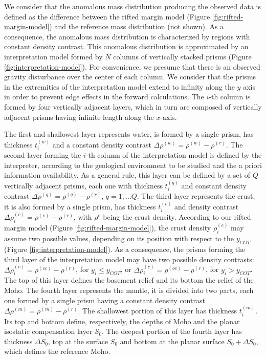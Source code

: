 \documentclass[manuscript]{geophysics}
\begin{document}
We consider that the anomalous mass distribution producing the observed data
is defined as the difference between the rifted margin model (Figure
\ref{fig:rifted-margin-model}) and the reference mass distribution (not shown).
As a consequence, the anomalous mass distribution is characterized by regions
with constant density contrast.
This anomalous distribution is approximated by an interpretation model 
formed by $N$ columns of vertically stacked prisms (Figure 
\ref{fig:interpretation-model}).
For convenience, we presume that there is an observed gravity disturbance over the
center of each column.
We consider that the prisms in the extremities of the interpretation model extend to
infinity along the $y$ axis in order to prevent edge effects in the forward 
calculations. 
The $i$-th column is formed by four vertically adjacent layers, which in turn are
composed of vertically adjacent prisms having infinite length along the $x$-axis.

The first and shallowest layer represents water, 
is formed by a single prism, has thickness $t^{(w)}_{i}$ and a constant density
contrast $\Delta \rho^{(w)} = \rho^{(w)} - \rho^{(r)}$.
The second layer forming the $i$-th column of the interpretation model is defined by
the interpreter, according to the geological environment to be studied and the a priori
information availability. 
As a general rule, this layer can be defined by a set of $Q$ vertically adjacent
prisms, each one with thickness $t^{(q)}_{i}$ and constant density contrast
$\Delta \rho^{(q)} = \rho^{(q)} - \rho^{(r)}$, $q = 1, \dots Q$.
The third layer represents the crust, it is also formed by a single prism,
has thickness $t^{(c)}_{i}$ and density contrast 
$\Delta \rho^{(c)}_{i} = \rho^{(c)} - \rho^{(r)}$, 
with $\rho^{c}$ being the crust density. 
According to our rifted margin model (Figure \ref{fig:rifted-margin-model}), the crust
density $\rho^{(c)}_{i}$ may assume two possible values, depending on its position
with respect to the $y_{COT}$ (Figure \ref{fig:interpretation-model}).
As a consequence, the prisms forming the third layer of the interpretation model may
have two possible density contrasts: $\Delta \rho^{(c)}_{i} = \rho^{(cc)} - \rho^{(r)}$,
for $y_{i} \le y_{COT}$, or $\Delta \rho^{(c)}_{i} = \rho^{(oc)} - \rho^{(r)}$,
for $y_{i} > y_{COT}$. 
The top of this layer defines the basement relief and its bottom the relief of the
Moho. 
The fourth layer represents the mantle, it is divided into two parts, each one formed
by a single prism having a constant density contrast 
$\Delta \rho^{(m)} = \rho^{(m)} - \rho^{(r)}$. The shallowest
portion of this layer has thickness $t^{(m)}_{i}$. Its top and bottom define,
respectively, the depths of Moho and the planar isostatic compensation layer $S_{0}$.
The deepest portion of the fourth layer has thickness $\Delta S_{0}$, top at the
surface $S_{0}$ and bottom at the planar surface 
$S_{0} + \Delta S_{0}$, which defines the reference Moho. 
\end{document}
